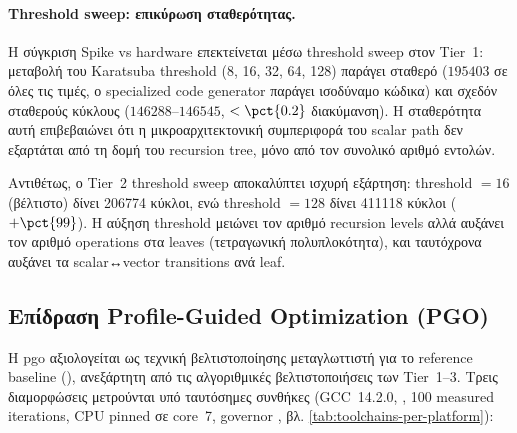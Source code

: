 \paragraph{Threshold sweep: επικύρωση σταθερότητας.}
Η σύγκριση Spike vs hardware επεκτείνεται μέσω threshold sweep στον
Tier~1: μεταβολή του Karatsuba threshold (8, 16, 32, 64, 128)
παράγει σταθερό \instret ($\num{195403}$ σε όλες τις τιμές, ο
specialized code generator παράγει ισοδύναμο κώδικα) και σχεδόν σταθερούς
κύκλους ($\num{146288}$–$\num{146545}$, $<\pct{0.2}$ διακύμανση). Η
σταθερότητα αυτή επιβεβαιώνει ότι η μικροαρχιτεκτονική συμπεριφορά του
scalar path δεν εξαρτάται από τη δομή του recursion tree, μόνο από τον
συνολικό αριθμό εντολών.

Αντιθέτως, ο Tier~2 threshold sweep αποκαλύπτει ισχυρή
εξάρτηση: threshold $= 16$ (βέλτιστο) δίνει \num{206774} κύκλοι, ενώ
threshold $= 128$ δίνει \num{411118} κύκλοι ($+\pct{99}$). Η αύξηση
threshold μειώνει τον αριθμό recursion levels αλλά αυξάνει τον αριθμό
 operations στα leaves (τετραγωνική πολυπλοκότητα), και
ταυτόχρονα αυξάνει τα scalar↔vector transitions ανά leaf.

\ifTODO
\subsection{Επίδραση Profile-Guided Optimization (PGO)}
\label{ssec:hw-pgo-results}

Η \gls{pgo} αξιολογείται ως τεχνική βελτιστοποίησης μεταγλωττιστή για το
reference baseline (), ανεξάρτητη από τις αλγοριθμικές
βελτιστοποιήσεις των Tier~1–3. Τρεις διαμορφώσεις μετρούνται υπό ταυτόσημες
συνθήκες (GCC~14.2.0, , \num{100} measured iterations, CPU pinned
σε core~7, governor , βλ. \cref{tab:toolchains-per-platform}):

